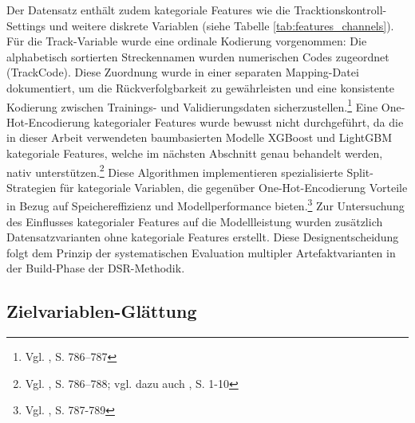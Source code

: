 Der Datensatz enthält zudem kategoriale Features wie die Tracktionskontroll-Settings und weitere diskrete Variablen (siehe Tabelle \ref{tab:features_channels}). Für die Track-Variable wurde eine ordinale Kodierung vorgenommen: Die alphabetisch sortierten Streckennamen wurden numerischen Codes zugeordnet (TrackCode). Diese Zuordnung wurde in einer separaten Mapping-Datei dokumentiert, um die Rückverfolgbarkeit zu gewährleisten und eine konsistente Kodierung zwischen Trainings- und Validierungsdaten sicherzustellen.\footnote{Vgl. \cite{Chen2016}, S. 786–787}
Eine One-Hot-Encodierung kategorialer Features wurde bewusst nicht durchgeführt, da die in dieser Arbeit verwendeten baumbasierten Modelle XGBoost und LightGBM kategoriale Features, welche im nächsten Abschnitt genau behandelt werden, nativ unterstützen.\footnote{Vgl. \cite{Chen2016}, S. 786–788; vgl. dazu auch \cite{Ke2017}, S. 1-10} Diese Algorithmen implementieren spezialisierte Split-Strategien für kategoriale Variablen, die gegenüber One-Hot-Encodierung Vorteile in Bezug auf Speichereffizienz und Modellperformance bieten.\footnote{Vgl. \cite{Chen2016}, S. 787-789}
Zur Untersuchung des Einflusses kategorialer Features auf die Modellleistung wurden zusätzlich Datensatzvarianten ohne kategoriale Features erstellt. Diese Designentscheidung folgt dem Prinzip der systematischen Evaluation multipler Artefaktvarianten in der Build-Phase der \ac{DSR}-Methodik.


\subsection{Zielvariablen-Glättung}

